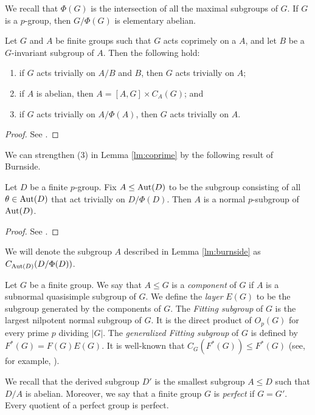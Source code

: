 \documentclass[bysection, amsart]{standard}
\begin{document}
We recall that $\Phi(G)$ is the intersection of all the maximal subgroups of $G$. If $G$ is a $p$-group, then $G/\Phi(G)$ is elementary abelian.
\begin{lemma} \label{lm:coprime}
    Let $G$ and $A$ be finite groups such that $G$ acts coprimely on a $A$, and let $B$ be a $G$-invariant subgroup of $A$. Then the following hold:
    \begin{enumerate}
        \item if $G$ acts trivially on $A/B$ and $B$, then $G$ acts trivially on $A$; 
        \item if $A$ is abelian, then $A = [A, G] \times C_A(G)$; and
        \item if $G$ acts trivially on $A/\Phi(A)$, then $G$ acts trivially on $A$.
    \end{enumerate}
\end{lemma}
\begin{proof}
    See \cite[Section 8]{ks06}.
\end{proof}

We can strengthen (3) in Lemma \ref{lm:coprime} by the following result of Burnside.

\begin{lemma}[Burnside] \label{lm:burnside}
    Let $D$ be a finite $p$-group. Fix $A \leq \operatorname{Aut}(D)$ to be the subgroup consisting of all $\theta \in \operatorname{Aut}(D)$ that act trivially on $D/\Phi(D)$. Then $A$ is a normal $p$-subgroup of $\operatorname{Aut}(D)$.
\end{lemma}
\begin{proof}
    See \cite[Theorem I.5.1.4]{gor07}.
\end{proof}
\noindent We will denote the subgroup $A$ described in Lemma \ref{lm:burnside} as $C_{\operatorname{Aut}(D)}(D/\Phi(D))$.

Let $G$ be a finite group. We say that $A \leq G$ is a \emph{component} of $G$ if $A$ is a subnormal quasisimple subgroup of $G$. We define the \emph{layer} $E(G)$ to be the subgroup generated by the components of $G$. The \emph{Fitting subgroup} of $G$ is the largest nilpotent normal subgroup of $G$. It is the direct product of $O_p(G)$ for every prime $p$ dividing $|G|$. The \emph{generalized Fitting subgroup} of $G$ is defined by $F^*(G) = F(G) E(G)$. It is well-known that $C_G(F^*(G)) \leq F^*(G)$ (see, for example, \cite[31.13]{book:aschbacher}).

We recall that the derived subgroup $D'$ is the smallest subgroup $A \leq D$ such that $D/A$ is abelian. Moreover, we say that a finite group $G$ is \emph{perfect} if $G = G'$. Every quotient of a perfect group is perfect.
\end{document}
